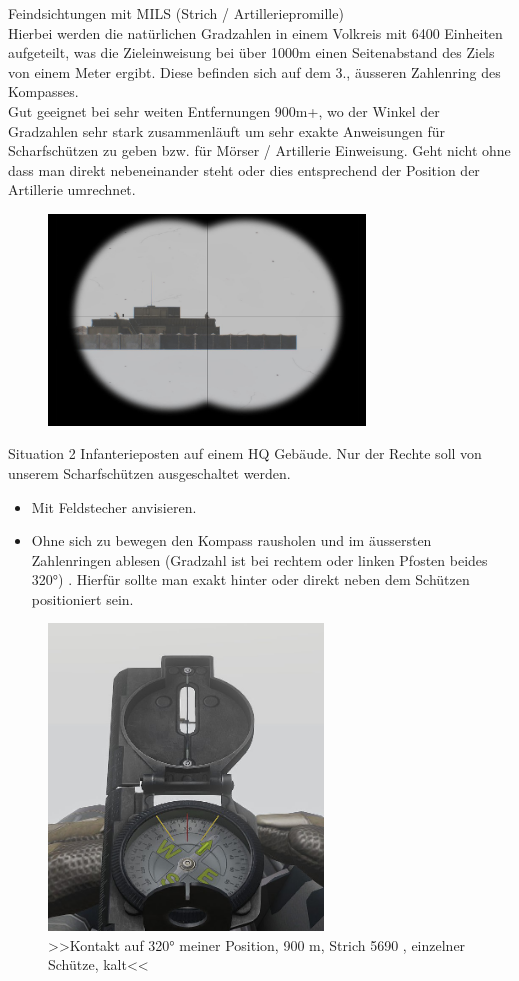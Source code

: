 Feindsichtungen mit MILS (Strich / Artilleriepromille) \\

Hierbei werden die natürlichen Gradzahlen in einem Volkreis mit 6400 Einheiten aufgeteilt, was die Zieleinweisung bei über 1000m einen Seitenabstand des Ziels von einem Meter ergibt. Diese befinden sich auf dem 3., äusseren Zahlenring des Kompasses.\\
Gut geeignet bei sehr weiten Entfernungen 900m+, wo der Winkel der Gradzahlen sehr stark zusammenläuft um sehr exakte Anweisungen für Scharfschützen zu geben bzw. für Mörser / Artillerie Einweisung. Geht nicht ohne dass man direkt nebeneinander steht oder dies entsprechend der Position der Artillerie umrechnet.  \\

\begin{figure}[!h]
	\centering
	\includegraphics[width=0.75\textwidth]{../img/advanced/kartenarbeit/Kompass5.jpg}
\end{figure}
Situation 2 Infanterieposten auf einem HQ Gebäude. Nur der Rechte soll von unserem Scharfschützen ausgeschaltet werden.\\
\begin{itemize}
 	\item Mit Feldstecher anvisieren.
	\item Ohne sich zu bewegen den Kompass rausholen und im äussersten Zahlenringen ablesen (Gradzahl ist bei rechtem oder linken Pfosten beides 320°) . Hierfür sollte man exakt hinter oder direkt neben dem Schützen positioniert sein.
	\end{itemize}
\begin{figure}[!h]
	\centering
	\includegraphics[width=0.65\textwidth]{../img/advanced/kartenarbeit/Kompass6.jpg}
	\caption{>>Kontakt auf 320° meiner Position, 900 m, Strich 5690 , einzelner Schütze, kalt<<}
\end{figure}
